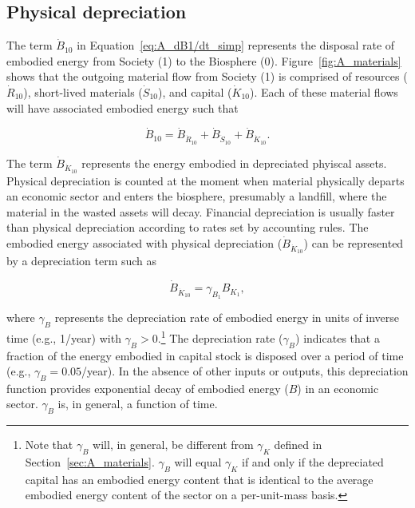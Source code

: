 \subsection{Physical depreciation}
\label{sec:depreciation_embodied}

The term $\dot{B}_{10}$ in Equation~\ref{eq:A_dB1/dt_simp}
represents the disposal rate 
of embodied energy from Society (1) to the Biosphere (0). 
Figure~\ref{fig:A_materials} shows that the outgoing material flow
from Society (1) is comprised of 
resources ($\dot{R}_{10}$),
short-lived materials ($\dot{S}_{10}$), and 
capital ($\dot{K}_{10}$). 
Each of these material flows will have associated embodied energy such that

\begin{equation} \label{eq:A-depreciation-of-B}
	\dot{B}_{10}
	= \dot{B}_{\dot{R}_{10}}
	+ \dot{B}_{\dot{S}_{10}}
	+ \dot{B}_{\dot{K}_{10}}.
\end{equation}

The term $\dot{B}_{\dot{K}_{10}}$ represents the energy embodied
in depreciated phyiscal assets.
Physical depreciation
is counted at the moment when material physically departs an economic sector 
and enters the biosphere, presumably a landfill, 
where the material in the wasted assets will decay.
Financial depreciation
is usually faster than physical depreciation
according to rates set by accounting rules.
The embodied energy associated with physical depreciation ($\dot{B}_{\dot{K}_{10}}$)
can be represented by a depreciation term such as

\begin{equation} \label{eq:depreciation_term_defined}
	\dot{B}_{\dot{K}_{10}} 
	= \gamma_{B_{1}} B_{K_{1}},
\end{equation}

\noindent{}where $\gamma_{B}$ represents the depreciation rate 
of embodied energy in units of inverse time (e.g., 1/year) 
with $\gamma_{B} > 0$.\footnote{Note that $\gamma_B$ will, in general,
	be different from $\gamma_{K}$ defined in Section~\ref{sec:A_materials}.
	$\gamma_{B}$ will equal $\gamma_{K}$ if and only if 
	the depreciated capital has an embodied energy content that is 
	identical to the average embodied energy content 
	of the sector on a per-unit-mass basis.}
The depreciation rate ($\gamma_{B}$) indicates that 
a fraction of the energy embodied in capital stock
is disposed over a period of time (e.g., $\gamma_{B} = 0.05$/year). 
In the absence of other inputs or outputs, 
this depreciation function provides exponential decay 
of embodied energy ($B$) in an economic sector. 
$\gamma_{B}$ is, in general, a function of time.

